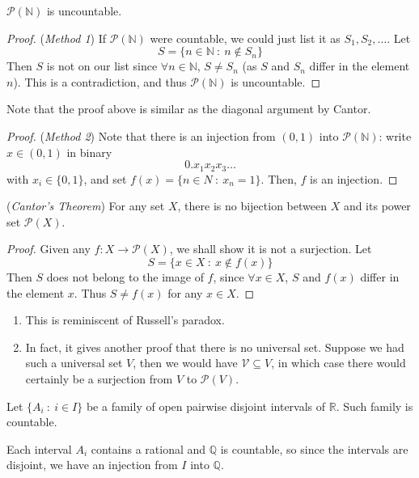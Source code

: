 \documentclass[10pt, a4paper, twoside]{report}
\begin{document}
\begin{theorem}
    \(\mathcal{P}(\mathbb{N})\) is uncountable.
    \label{thm:uncountable_powern}
\end{theorem}
\begin{proof}
    (\emph{Method 1}) If \(\mathcal{P}(\mathbb{N})\) were countable, we could just list it as \(S_1,S_2,\ldots\). Let 
    \[S=\{n\in\mathbb{N}\::\:n\notin S_n\}\]
    Then \(S\) is not on our list since \(\forall n\in\mathbb{N}\), \(S\neq S_n\) (as \(S\) and \(S_n\) differ in the element \(n\)). This is a contradiction, and thus \(\mathcal{P}(\mathbb{N})\) is uncountable.
\end{proof}
Note that the proof above is similar as the diagonal argument by Cantor.
\begin{proof}
    (\emph{Method 2}) Note that there is an injection from \((0,1)\) into \(\mathcal{P}(\mathbb{N})\): write \(x\in(0,1)\) in binary 
    \[0.x_1x_2x_3\ldots\]
    with \(x_i\in\{0,1\}\), and set \(f(x)=\{n\in N\::\:x_n=1\}\). Then, \(f\) is an injection.
\end{proof}
\begin{theorem} (\emph{Cantor's Theorem})
    For any set \(X\), there is no bijection between \(X\) and its power set \(\mathcal{P}(X)\).
\end{theorem}
\begin{proof}
    Given any \(f:X\to\mathcal{P}(X)\), we shall show it is not a surjection. Let
    \[S=\{x\in X\::\:x\notin f(x)\}\]
    Then \(S\) does not belong to the image of \(f\), since \(\forall x\in X\), \(S\) and \(f(x)\) differ in the element \(x\). Thus \(S\neq f(x)\) for any \(x\in X\).
\end{proof}
\begin{remark} \item[]
    \begin{enumerate}
        \item This is reminiscent of Russell's paradox.
        \item In fact, it gives another proof that there is no universal set. Suppose we had such a universal set \(V\), then we would have \(\mathcal{V}\subseteq V\), in which case there would certainly be a surjection from \(V\) to \(\mathcal{P}(V)\).
    \end{enumerate}
\end{remark}
\begin{example}
    Let \(\{A_i\::\:i\in I\}\) be a family of open pairwise disjoint intervals of \(\mathbb{R}\). Such family is countable. 

    Each interval \(A_i\) contains a rational and \(\mathbb{Q}\) is countable, so since the intervals are disjoint, we have an injection from \(I\) into \(\mathbb{Q}\).
    \label{eg:disjoint_countable}
\end{example}
\end{document}
